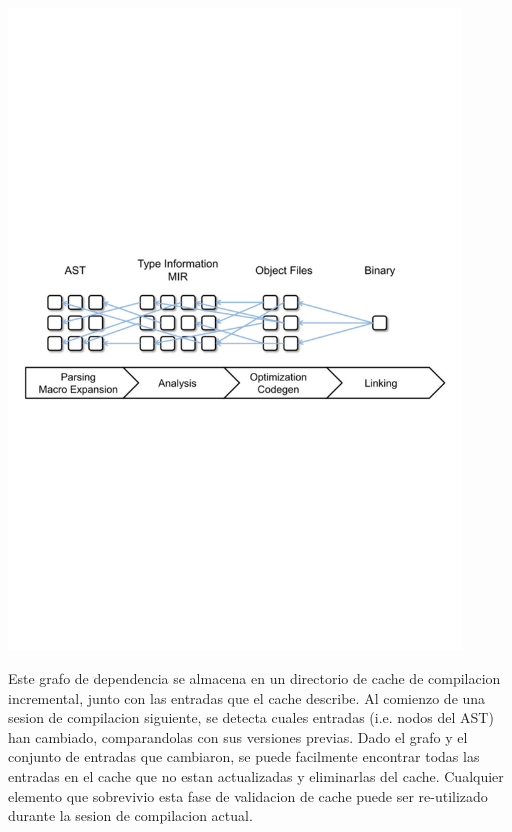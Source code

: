 \documentclass[12pt, a4paper]{report}
\begin{document}
    \noindent
    \includegraphics[width=0.9\textwidth]{woe16_compiler_dep_graph}

    Este grafo de dependencia se almacena en un directorio de cache de compilacion incremental, junto con las entradas que el cache describe.
    Al comienzo de una sesion de compilacion siguiente, se detecta cuales entradas (i.e. nodos del AST) han cambiado, comparandolas con sus versiones previas.
    Dado el grafo y el conjunto de entradas que cambiaron, se puede facilmente encontrar todas las entradas en el cache que no estan actualizadas y eliminarlas del cache.
    Cualquier elemento que sobrevivio esta fase de validacion de cache puede ser re-utilizado durante la sesion de compilacion actual.
    \cite{rust_blog_incremental_compilation}
\end{document}
